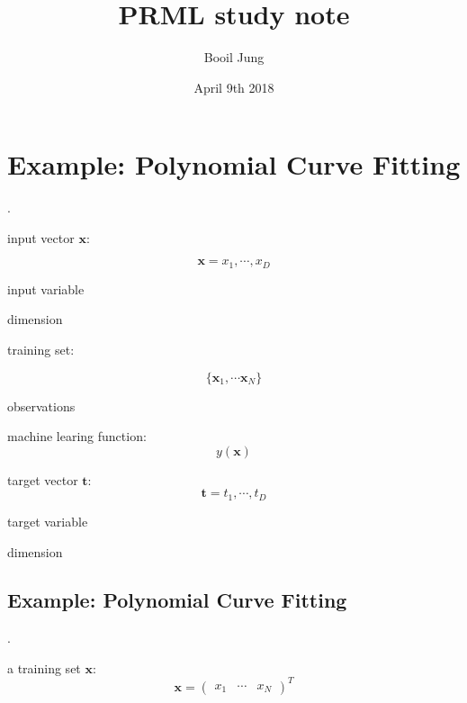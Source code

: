 \documentclass[11pt, a4paper, oneside]{article}
\begin{document}
\title{PRML study note}
\author{Booil Jung}
\date{April 9th 2018}
\maketitle

\section{Example: Polynomial Curve Fitting}
.

input vector $\mathbf{x}$:

$$
\mathbf{x} = { x_1, \cdots , x_D }
$$
\begin{description}[labelwidth=\widthof{\bfseries 1234567890},align=parright]
	\item[$x:$] input variable
	\item[$D:$] dimension
\end{description}

\bigskip

training set: 

$$
\{ \mathbf{x}_1, \cdots \mathbf{x}_N \}
$$

\begin{description}[labelwidth=\widthof{\bfseries 1234567890},align=parright]
	\item[$N:$] observations
\end{description}

\bigskip

machine learing function:
$$
y(\mathbf{x})
$$

\bigskip

target vector $\mathbf{t}$:
$$
\mathbf{t} = { t_1, \cdots , t_D }
$$
\begin{description}[labelwidth=\widthof{\bfseries 1234567890},align=parright]
	\item[$t:$] target variable
	\item[$D:$] dimension
\end{description}

\bigskip

\subsection{Example: Polynomial Curve Fitting}
.

a training set $\mathbf{x}$:
$$
\mathbf{x}
= \begin{pmatrix}
x_1 & \cdots & x_N
\end{pmatrix} ^T 
$$

\bigskip
\end{document}
